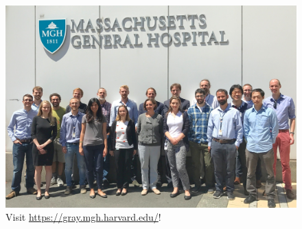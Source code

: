 \documentclass[pdf,dvipsnames,aspectratio=169]{beamer}
\begin{document}
\begin{frame}[plain]
    \centering
    \begin{figure}[h]
        \includegraphics[height=0.9\textheight]{imgs/group.JPG}\\
        Visit \url{https://gray.mgh.harvard.edu/}!
    \end{figure}
\end{frame}
\end{document}

